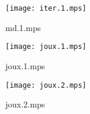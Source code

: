 \documentclass[letterpaper,10pt]{article}
\begin{document}
\begin{figure}
    \centering
    \texttt{[image: iter.1.mps]}
    \caption{md.1.mps}
\end{figure}

\begin{figure}
    \centering
    \texttt{[image: joux.1.mps]}
    \caption{joux.1.mps}
\end{figure}

\begin{figure}
    \centering
    \texttt{[image: joux.2.mps]}
    \caption{joux.2.mps}
\end{figure}
\end{document}
